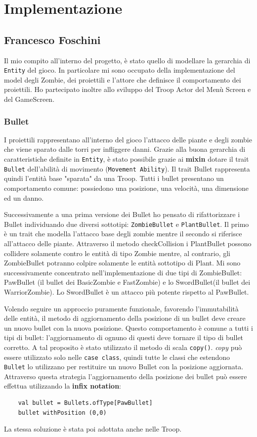 \newpage
\section{Implementazione}


\subsection{Francesco Foschini}
Il mio compito all'interno del progetto, è stato quello di modellare la gerarchia di \texttt{Entity} del gioco.
In particolare mi sono occupato della implementazione del model degli Zombie, dei proiettili e l'attore che definisce il comportamento dei proiettili.
Ho partecipato inoltre allo sviluppo del Troop Actor del Menù Screen e del GameScreen.

\subsubsection{Bullet}
I proiettili rappresentano all'interno del gioco l'attacco delle piante e degli zombie che viene sparato dalle torri
per infliggere danni. Grazie alla buona gerarchia di caratteristiche definite in \texttt{Entity}, è stato possibile grazie  ai \textbf{mixin}
dotare il trait \texttt{Bullet} dell'abilità di movimento (\texttt{Movement Ability}).
Il trait Bullet rappresenta quindi l'entità base "sparata" da una Troop.
Tutti i bullet presentano un comportamento comune: possiedono una posizione, una velocità, una dimensione ed un danno.


Successivamente a una prima versione dei Bullet ho pensato di rifattorizzare i Bullet individuando due diversi sottotipi: \texttt{ZombieBullet} e \texttt{PlantBullet}.
Il primo è un trait che modella l'attacco base degli zombie mentre il secondo si riferisce all'attacco delle piante.
Attraverso il metodo checkCollision i PlantBullet possono collidere solamente contro le entità di tipo Zombie mentre,
al contrario, gli ZombieBullet potranno colpire solamente le entità sottotipo di Plant.
Mi sono successivamente concentrato nell'implementazione di due tipi di ZombieBullet: PawBullet (il bullet dei
BasicZombie e FastZombie) e lo SwordBullet(il bullet dei WarriorZombie).
Lo SwordBullet è un attacco più potente rispetto al PawBullet.

Volendo seguire un approccio puramente funzionale, favorendo l'immutabilità delle entità, il metodo di
aggiornamento della posizione di un bullet deve creare un nuovo bullet con la nuova posizione.
Questo comportamento è comune a tutti i tipi di bullet: l'aggiornamento di ognuno di questi deve
tornare il tipo di bullet corretto. A tal proposito è stato utilizzato il metodo di scala  \texttt{copy()}.
\textit{copy} può essere utilizzato solo nelle \texttt{case class}, quindi tutte le classi che estendono
\texttt{Bullet} lo utilizzano per restituire un nuovo Bullet con la posizione aggiornata.
Attraverso questa strategia l'aggiornamento della posizione dei bullet può essere effettua utilizzando la \textbf{infix notation}:
\begin{verbatim}
    val bullet = Bullets.ofType[PawBullet]
    bullet withPosition (0,0)
\end{verbatim}
La stessa soluzione è stata poi adottata anche nelle Troop.

